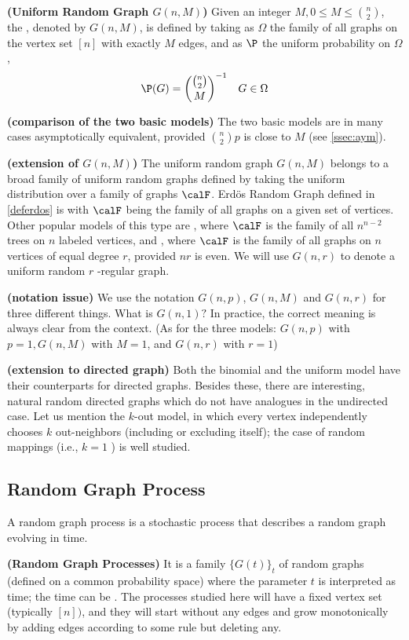 \documentclass{article}
\newcommand{\bfs}[1]{\textbf{({#1}) }}
\begin{document}
\begin{defa}{\bfs{Uniform Random  Graph $G (n, M)$}}
Given an integer $M, 0 \leq M \leq \binom{n}{2}$, the , denoted by $G(n, M)$, is defined by taking as $\Omega$ the family of all graphs on the vertex set $[n]$ with exactly $M$ edges, and as $\P$ the uniform probability on $\Omega$,
\begin{align*}
\P (G)=\binom{\binom{n}{2}}{M}^{-1}\quad G \in \Omega
\end{align*}
\end{defa}
\begin{rema}{\bfs{comparison of the two basic models}}
The two basic models are in many cases asymptotically equivalent, provided
$\binom{n}{2} p$ is close to $M$ (see \cref{ssec:aym}). 
\end{rema}
\begin{rema}{\bfs{extension of $G (n, M)$}}
The uniform random graph $G (n, M)$ belongs to a broad family of uniform random graphs defined by taking the uniform distribution over a family of graphs $\calF$. {Erd\"{o}s Random Graph} defined in \cref{deferdos} is with $\calF$ being the family of all graphs on a given set of vertices. Other popular models of this type are , where $\calF$ is the family of all $n^{n-2}$ trees on $n$ labeled vertices, and , where $\calF$ is the family of all graphs on $n$ vertices of equal degree $r$, provided $n r$ is even. We will use $G (n, r)$ to denote a uniform random $r$ -regular graph. 
\end{rema}
\begin{rema}{\bfs{notation issue}}
We use the notation $G (n, p)$, $G (n, M)$ and $G (n, r)$ for three different things. What is $G (n, 1) ?$ In practice, the correct meaning is always clear from the context. (As for the three models: $G (n, p)$ with $p=1, G (n, M)$ with $M=1$, and $G (n, r)$ with $r=1$)
\end{rema}
\begin{rema}{\bfs{extension to directed graph}}
Both the binomial and the uniform model have their counterparts for directed graphs. Besides these, there are interesting, natural random directed graphs which do not have analogues in the undirected case. Let us mention the $k$-out model, in which every vertex independently chooses $k$ out-neighbors (including or excluding itself); the case of random mappings (i.e., $k=1$ ) is well studied.
\end{rema}
\subsection{Random Graph Process}
A random graph process is a stochastic process that describes a random graph evolving in time. 
\begin{defa}{\bfs{Random Graph Processes}}
It is a family $\{ G (t)\}_{t}$ of random graphs (defined on a common probability space) where the parameter $t$ is interpreted as time; the time can be . The processes studied here will have a fixed vertex set (typically $[n])$, and they will start without any edges and grow monotonically by adding edges according to some rule but  deleting any.
\end{defa}
\end{document}
